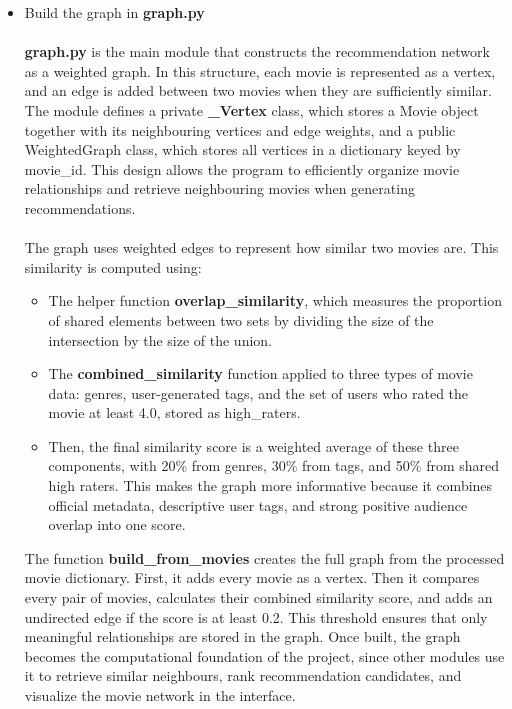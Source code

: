 \documentclass[fontsize=11pt]{article}
\begin{document}
\begin{itemize}
    \item Build the graph in \textbf{graph.py}
    \\
    \\
    \textbf{graph.py} is the main module that constructs the recommendation network as a weighted graph. In this structure, each movie is represented as a vertex, and an edge is added between two movies when they are sufficiently similar. The module defines a private \textbf{\_Vertex} class, which stores a Movie object together with its neighbouring vertices and edge weights, and a public WeightedGraph class, which stores all vertices in a dictionary keyed by movie\_id. This design allows the program to efficiently organize movie relationships and retrieve neighbouring movies when generating recommendations.
    \\
    \\
    The graph uses weighted edges to represent how similar two movies are. This similarity is computed using: 
    \begin{itemize}
        \item The helper function \textbf{overlap\_similarity}, which measures the proportion of shared elements between two sets by dividing the size of the intersection by the size of the union.
        \item The \textbf{combined\_similarity} function applied to three types of movie data: genres, user-generated tags, and the set of users who rated the movie at least 4.0, stored as high\_raters.
        \item Then, the final similarity score is a weighted average of these three components, with 20\% from genres, 30\% from tags, and 50\% from shared high raters. This makes the graph more informative because it combines official metadata, descriptive user tags, and strong positive audience overlap into one score.
    \end{itemize}
    
    The function \textbf{build\_from\_movies} creates the full graph from the processed movie dictionary. First, it adds every movie as a vertex. Then it compares every pair of movies, calculates their combined similarity score, and adds an undirected edge if the score is at least 0.2. This threshold ensures that only meaningful relationships are stored in the graph. Once built, the graph becomes the computational foundation of the project, since other modules use it to retrieve similar neighbours, rank recommendation candidates, and visualize the movie network in the interface.


\end{itemize}
\end{document}
